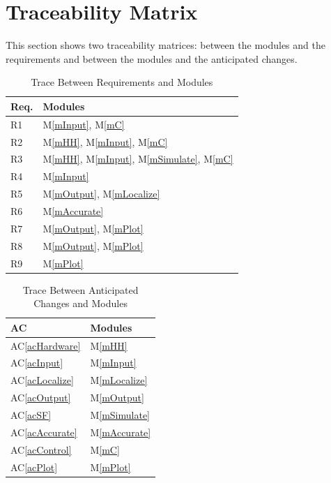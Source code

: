 \documentclass[12pt, titlepage]{article}
\newcommand{\acref}[1]{AC\ref{#1}}
\newcommand{\mref}[1]{M\ref{#1}}
\begin{document}

\section{Traceability Matrix} \label{SecTM}

This section shows two traceability matrices: between the modules and the
requirements and between the modules and the anticipated changes.

\begin{table}[H]
\centering
\begin{tabular}{p{} p{}}
\toprule
\textbf{Req.} & \textbf{Modules}\\
\midrule
R1 & \mref{mInput}, \mref{mC}\\
R2 & \mref{mHH}, \mref{mInput}, \mref{mC}\\
R3 & \mref{mHH}, \mref{mInput}, \mref{mSimulate}, \mref{mC}\\
R4 & \mref{mInput}\\
R5 & \mref{mOutput}, \mref{mLocalize}\\
R6 & \mref{mAccurate}\\
R7 & \mref{mOutput}, \mref{mPlot}\\
R8 & \mref{mOutput}, \mref{mPlot}\\
R9 & \mref{mPlot}\\
\bottomrule
\end{tabular}
\caption{Trace Between Requirements and Modules}
\label{TblRT}
\end{table}

\begin{table}[H]
\centering
\begin{tabular}{p{} p{}}
\toprule
\textbf{AC} & \textbf{Modules}\\
\midrule
\acref{acHardware} & \mref{mHH}\\
\acref{acInput} & \mref{mInput}\\
\acref{acLocalize} & \mref{mLocalize}\\
\acref{acOutput} & \mref{mOutput}\\
\acref{acSF} & \mref{mSimulate}\\
\acref{acAccurate} & \mref{mAccurate}\\
\acref{acControl} & \mref{mC}\\
\acref{acPlot} & \mref{mPlot}\\
\bottomrule
\end{tabular}
\caption{Trace Between Anticipated Changes and Modules}
\label{TblACT}
\end{table}
\end{document}
